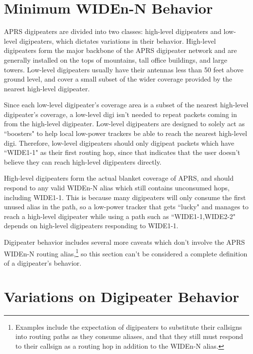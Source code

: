 \section{Minimum WIDEn-N Behavior}

APRS digipeaters are divided into two classes: high-level digipeaters and
low-level digipeaters, which dictates variations in their behavior.
High-level digipeaters form the major backbone of the APRS digipeater network
and are generally installed on the tops of mountains,
tall office buildings, and large towers.
Low-level digipeaters usually have their antennas less than 50 feet above ground
level, and cover a small subset of the wider coverage provided by the
nearest high-level digipeater.

Since each low-level digipeater's coverage area is a subset of the
nearest high-level digipeater's coverage, a low-level digi isn't needed
to repeat packets coming in from the high-level digipeater.
Low-level digipeaters are designed to solely act as ``boosters" to
help local low-power trackers be able to reach the nearest high-level digi.
Therefore, low-level digipeaters should only digipeat packets which
have ``WIDE1-1" as their first routing hop, since that indicates that
the user doesn't believe they can reach high-level digipeaters directly.

High-level digipeaters form the actual blanket coverage of APRS, and
should respond to any valid WIDEn-N alias which still contains unconsumed hops,
including WIDE1-1. This is because many digipeaters will only consume the first
unused alias in the path, so a low-power tracker that gets ``lucky" and manages to
reach a high-level digipeater while using a path such as ``WIDE1-1,WIDE2-2"
depends on high-level digipeaters responding to WIDE1-1.

Digipeater behavior includes several more caveats which don't involve the APRS
WIDEn-N routing alias,\footnote{Examples include the expectation of digipeaters
	to substitute their callsigns into routing paths as they consume aliases,
	and that they still must respond to their callsign as a routing hop in 
addition to the WIDEn-N alias.} 
so this section can't be considered a complete definition of a digipeater's behavior.

\section{Variations on Digipeater Behavior}

